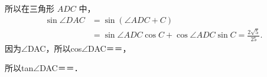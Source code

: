 \begin{question}
\begin{solution}
所以在三角形 $ADC$ 中，
\[
\begin{aligned}
\sin\angle DAC
&=\sin(\angle ADC+C)\\
&=\sin\angle ADC\cos C+\cos\angle ADC\sin C
=\frac{2\sqrt5}{25}.
\end{aligned}
\]
因为$\angle$DAC\allowbreak{}，所以cos$\angle$DAC＝\allowbreak{}＝\allowbreak{}，\par
所以tan$\angle$DAC＝\allowbreak{}＝\allowbreak{}．\par
\begin{center}
\allowbreak{}
\end{center}
\end{solution}
\end{question}

